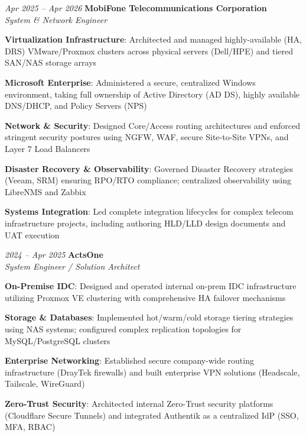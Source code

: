 \begin{twocolentry}{\textit{Apr 2025 -- Apr 2026}}
    \textbf{MobiFone Telecommunications Corporation} \\[4pt]
    \textit{System \& Network Engineer}
\end{twocolentry}
\begin{onecolentry}
    \begin{highlights}
        \item \textbf{Virtualization Infrastructure}: Architected and managed highly-available (HA, DRS) VMware/Proxmox clusters across physical servers (Dell/HPE) and tiered SAN/NAS storage arrays
        \item \textbf{Microsoft Enterprise}: Administered a secure, centralized Windows environment, taking full ownership of Active Directory (AD DS), highly available DNS/DHCP, and Policy Servers (NPS)
        \item \textbf{Network \& Security}: Designed Core/Access routing architectures and enforced stringent security postures using NGFW, WAF, secure Site-to-Site VPNs, and Layer 7 Load Balancers
        \item \textbf{Disaster Recovery \& Observability}: Governed Disaster Recovery strategies (Veeam, SRM) ensuring RPO/RTO compliance; centralized observability using LibreNMS and Zabbix
        \item \textbf{Systems Integration}: Led complete integration lifecycles for complex telecom infrastructure projects, including authoring HLD/LLD design documents and UAT execution
    \end{highlights}
\end{onecolentry}
\vspace{0.2 cm}

\begin{twocolentry}{\textit{2024 -- Apr 2025}}
    \textbf{ActsOne} \\[4pt]
    \textit{System Engineer / Solution Architect}
\end{twocolentry}
\begin{onecolentry}
    \begin{highlights}
        \item \textbf{On-Premise IDC}: Designed and operated internal on-prem IDC infrastructure utilizing Proxmox VE clustering with comprehensive HA failover mechanisms
        \item \textbf{Storage \& Databases}: Implemented hot/warm/cold storage tiering strategies using NAS systems; configured complex replication topologies for MySQL/PostgreSQL clusters
        \item \textbf{Enterprise Networking}: Established secure company-wide routing infrastructure (DrayTek firewalls) and built enterprise VPN solutions (Headscale, Tailscale, WireGuard)
        \item \textbf{Zero-Trust Security}: Architected internal Zero-Trust security platforms (Cloudflare Secure Tunnels) and integrated Authentik as a centralized IdP (SSO, MFA, RBAC)
    \end{highlights}
\end{onecolentry}
\vspace{0.2 cm}

